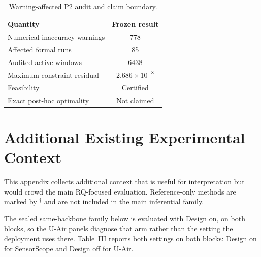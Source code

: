 \begin{table}[!t]
\centering
\caption{Warning-affected P2 audit and claim boundary.}
\label{tab:app_p2_warning_audit}
\footnotesize
\setlength{\tabcolsep}{5pt}
\begin{tabular*}{\columnwidth}{@{\extracolsep{\fill}}lc}
\toprule
Quantity & Frozen result\\
\midrule
Numerical-inaccuracy warnings & 778\\
Affected formal runs & 85\\
Audited active windows & 6438\\
Maximum constraint residual & $2.686\times10^{-8}$\\
Feasibility & Certified\\
Exact post-hoc optimality & Not claimed\\
\bottomrule
\end{tabular*}
\end{table}


\FloatBarrier

\section{Additional Existing Experimental Context}
\label{app:additional_context}

This appendix collects additional context that is useful for interpretation but
would crowd the main RQ-focused evaluation.  Reference-only methods are marked
by $^\dagger$ and are not included in the main inferential family.

The sealed same-backbone family below is evaluated with Design on, on both
blocks, so the U-Air panels diagnose that arm rather than the setting the
deployment uses there.  Table~III reports both settings on both blocks: Design
on for SensorScope and Design off for U-Air.

